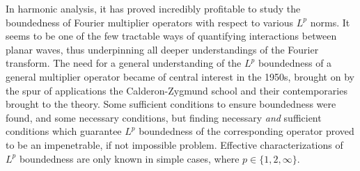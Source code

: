 \documentclass[11pt]{article}
\DeclareMathOperator{\RR}{\mathbb{R}}
\begin{document}
In harmonic analysis, it has proved incredibly profitable to study the boundedness of Fourier multiplier operators with respect to various $L^p$ norms. It seems to be one of the few tractable ways of quantifying interactions between planar waves, thus underpinning all deeper understandings of the Fourier transform. The need for a general understanding of the $L^p$ boundedness of a general multiplier operator became of central interest in the 1950s, brought on by the spur of applications the Calderon-Zygmund school and their contemporaries brought to the theory. Some sufficient conditions to ensure boundedness were found, and some necessary conditions, but finding necessary \emph{and} sufficient conditions which guarantee $L^p$ boundedness of the corresponding operator proved to be an impenetrable, if not impossible problem. Effective characterizations of $L^p$ boundedness are only known in simple cases, where $p \in \{ 1, 2, \infty \}$.
%
%
%
%
%
%
%
%
%
% 
%
%
%
%
\end{document}

